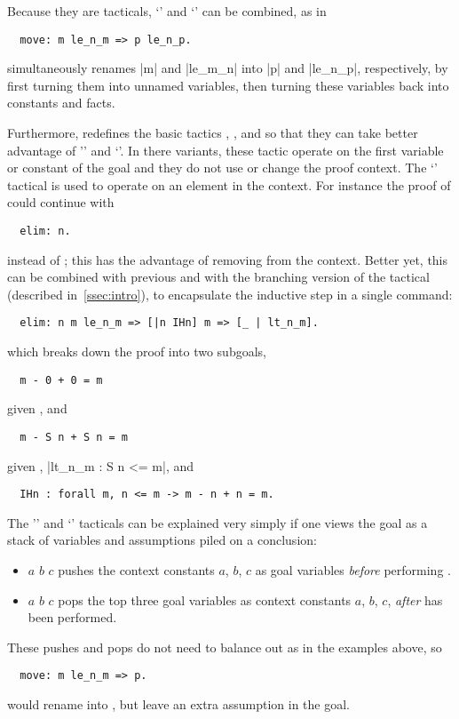 \noindent
Because they are tacticals, `\ssrC{:}' and `\ssrC{=>}' can be combined, as in
\begin{lstlisting}
  move: m le_n_m => p le_n_p.
\end{lstlisting}
simultaneously renames \ssrL|m| and \ssrL|le_m_n| into \ssrL|p| and \ssrL|le_n_p|,
respectively, by first turning them into unnamed variables, then
turning these variables back into constants and facts.

Furthermore, \ssr{} redefines the basic \Coq{} tactics ,
, and  so that they can take better advantage of
'\ssrC{:}' and `\ssrC{=>}'. In there \ssr{} variants, these tactic operate
on the first  variable or constant of the goal and they do not use or
change the proof context. The `\ssrC{:}' tactical is used to operate on
an element in the context. For instance the proof of  could
continue with
\begin{lstlisting}
  elim: n.
\end{lstlisting}
instead of ; this has the advantage of
removing  from the context. Better yet, this  can be combined
with previous  and with the branching version of the \ssrC{=>} tactical
(described in~\ref{ssec:intro}),
to encapsulate the inductive step in a single command:
\begin{lstlisting}
  elim: n m le_n_m => [|n IHn] m => [_ | lt_n_m].
\end{lstlisting}
which breaks down the proof into two subgoals,
\begin{lstlisting}
  m - 0 + 0 = m
\end{lstlisting}
given , and
\begin{lstlisting}
  m - S n + S n = m
\end{lstlisting}
given , \ssrL|lt_n_m : S n <= m|, and
\begin{lstlisting}
  IHn : forall m, n <= m -> m - n + n = m.
\end{lstlisting}
The '\ssrC{:}' and `\ssrC{=>}' tacticals can be explained very simply
if one views the goal as a stack of variables and assumptions piled
on a conclusion:
\begin{itemize}
\item {\tac} \ssrC{:} $a$ $b$ $c$ pushes the context constants $a$, $b$, $c$
as goal variables \emph{before} performing {\tac}.
\item {\tac} \ssrC{=>} $a$ $b$ $c$ pops the top three goal variables as
context constants $a$, $b$, $c$, \emph{after} {\tac}
has been performed.
\end{itemize}
These pushes and pops do not need to balance out as in the examples above,
so
\begin{lstlisting}
  move: m le_n_m => p.
\end{lstlisting}
would rename  into , but leave an extra assumption 
in the goal.


